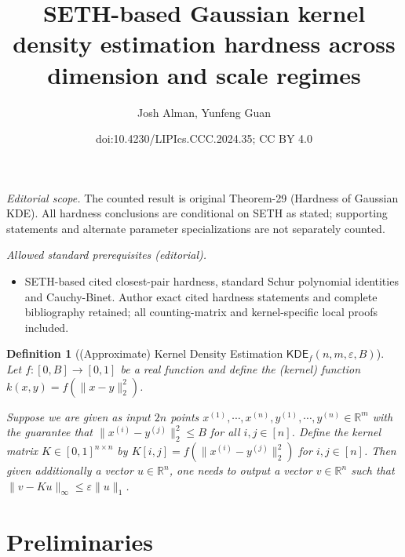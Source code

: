 \documentclass[10pt,a4paper]{article}
\title{SETH-based Gaussian kernel density estimation hardness across dimension and scale regimes}
\author{Josh Alman, Yunfeng Guan}
\date{doi:10.4230/LIPIcs.CCC.2024.35; CC BY 4.0}
\newtheorem{definition}[theorem]{Definition}
\theoremstyle{remark}
\numberwithin{equation}{section}
\numberwithin{theorem}{section}
\newcommand{\R}{\ensuremath{\mathbb{R}}}
\newcommand{\eps}{\varepsilon}
\begin{document}
\maketitle
\setcounter{section}{1}
\noindent\textit{Editorial scope.} The counted result is original Theorem-29 (Hardness of Gaussian KDE). All hardness conclusions are conditional on SETH as stated; supporting statements and alternate parameter specializations are not separately counted.\par\medskip
\noindent\textit{Allowed standard prerequisites (editorial).}\begin{itemize}
\item SETH-based cited closest-pair hardness, standard Schur polynomial identities and Cauchy-Binet. Author exact cited hardness statements and complete bibliography retained; all counting-matrix and kernel-specific local proofs included.
\end{itemize}\medskip
\begin{definition}[(Approximate) Kernel Density Estimation $\mathsf{KDE}_f(n, m, \eps, B)$]
Let $f: [0, B] \rightarrow [0, 1]$ be a real function and define the (kernel) function $k(x, y) = f(\|x-y\|_2^2)$.

Suppose we are given as input $2n$ points $x^{(1)}, \cdots, x^{(n)}, y^{(1)}, \cdots, y^{(n)} \in \R^m$ with the guarantee that $\|x^{(i)} - y^{(j)}\|_2^2 \le B$ for all $i, j \in [n]$.
Define the kernel matrix $K \in [0,1]^{n \times n}$ by $K[i, j] = f(\|x^{(i)}- y^{(j)}\|_2^2)$ for $i, j \in [n]$.
Then given additionally a vector $u \in \R^n$, one needs to output a vector $v \in \R^n$ such that
$\|v - K u\|_{\infty} \le \eps\|u\|_{1}$.
\end{definition}

\section{Preliminaries}
\end{document}
